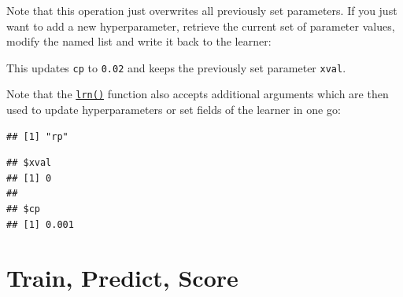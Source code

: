 \documentclass[
]{scrbook}
\newenvironment{Shaded}{\begin{snugshade}}{\end{snugshade}}
\newcommand{\AttributeTok}[1]{\textcolor[rgb]{0.77,0.63,0.00}{#1}}
\newcommand{\FloatTok}[1]{\textcolor[rgb]{0.00,0.00,0.81}{#1}}
\newcommand{\FunctionTok}[1]{\textcolor[rgb]{0.00,0.00,0.00}{#1}}
\newcommand{\NormalTok}[1]{#1}
\newcommand{\OtherTok}[1]{\textcolor[rgb]{0.56,0.35,0.01}{#1}}
\newcommand{\SpecialCharTok}[1]{\textcolor[rgb]{0.00,0.00,0.00}{#1}}
\newcommand{\StringTok}[1]{\textcolor[rgb]{0.31,0.60,0.02}{#1}}
\renewenvironment{Shaded} {\begin{snugshade}\small} {\end{snugshade}}
\begin{document}
Note that this operation just overwrites all previously set parameters.
If you just want to add a new hyperparameter, retrieve the current set of parameter values, modify the named list and write it back to the learner:

\begin{Shaded}
\end{Shaded}

This updates \texttt{cp} to \texttt{0.02} and keeps the previously set parameter \texttt{xval}.

Note that the \href{https://mlr3.mlr-org.com/reference/mlr_sugar.html}{\texttt{lrn()}} function also accepts additional arguments which are then used to update hyperparameters or set fields of the learner in one go:

\begin{Shaded}
\end{Shaded}

\begin{verbatim}
## [1] "rp"
\end{verbatim}

\begin{Shaded}
\end{Shaded}

\begin{verbatim}
## $xval
## [1] 0
## 
## $cp
## [1] 0.001
\end{verbatim}

\hypertarget{train-predict}{%
\section{Train, Predict, Score}\label{train-predict}}
\end{document}
